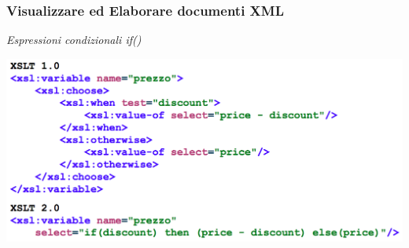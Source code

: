 \begin{frame}
    \frametitle{Visualizzare ed Elaborare documenti XML}
    \addtocounter{nframe}{1}
    
        \textit{Espressioni condizionali if()}

    \begin{center}
        \includegraphics[width=.8\textwidth]{imgs/esempio-espressioneCondizionale.png}
    \end{center}

\end{frame}



